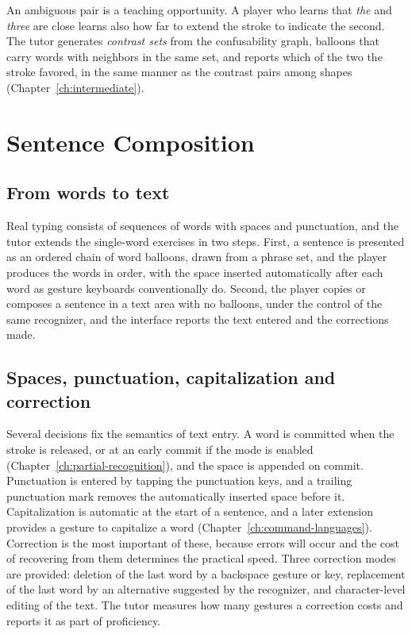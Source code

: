 An ambiguous pair is a teaching opportunity. A player who learns that \textit{the} and \textit{three} are close learns also how far to extend the stroke to indicate the second. The tutor generates \emph{contrast sets} from the confusability graph, balloons that carry words with neighbors in the same set, and reports which of the two the stroke favored, in the same manner as the contrast pairs among shapes (Chapter~\ref{ch:intermediate}).

\chapter{Sentence Composition}\label{ch:sentences}

\section{From words to text}

Real typing consists of sequences of words with spaces and punctuation, and the tutor extends the single-word exercises in two steps. First, a sentence is presented as an ordered chain of word balloons, drawn from a phrase set, and the player produces the words in order, with the space inserted automatically after each word as gesture keyboards conventionally do. Second, the player copies or composes a sentence in a text area with no balloons, under the control of the same recognizer, and the interface reports the text entered and the corrections made.

\section{Spaces, punctuation, capitalization and correction}

Several decisions fix the semantics of text entry. A word is committed when the stroke is released, or at an early commit if the mode is enabled (Chapter~\ref{ch:partial-recognition}), and the space is appended on commit. Punctuation is entered by tapping the punctuation keys, and a trailing punctuation mark removes the automatically inserted space before it. Capitalization is automatic at the start of a sentence, and a later extension provides a gesture to capitalize a word (Chapter~\ref{ch:command-languages}). Correction is the most important of these, because errors will occur and the cost of recovering from them determines the practical speed. Three correction modes are provided: deletion of the last word by a backspace gesture or key, replacement of the last word by an alternative suggested by the recognizer, and character-level editing of the text. The tutor measures how many gestures a correction costs and reports it as part of proficiency.


